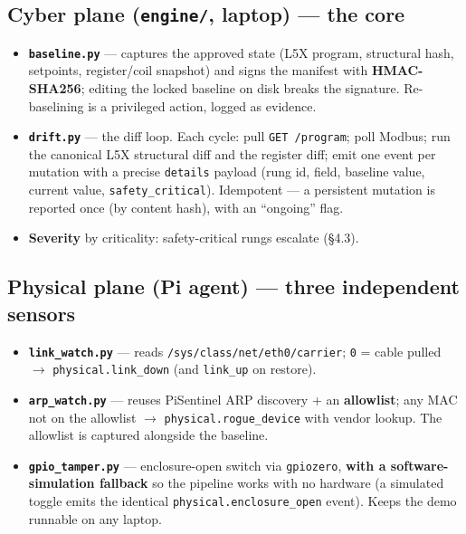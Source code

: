 \documentclass[11pt,a4paper]{article}
\newcommand{\code}[1]{\texttt{\small #1}}
\begin{document}
\subsection{Cyber plane (\texttt{engine/}, laptop) --- the core}
\begin{itemize}[leftmargin=1.4em,itemsep=2pt]
  \item \textbf{\code{baseline.py}} --- captures the approved state (L5X program, structural hash,
        setpoints, register/coil snapshot) and signs the manifest with \textbf{HMAC-SHA256}; editing
        the locked baseline on disk breaks the signature. Re-baselining is a privileged action, logged as evidence.
  \item \textbf{\code{drift.py}} --- the diff loop. Each cycle: pull \code{GET /program}; poll Modbus;
        run the canonical L5X structural diff and the register diff; emit one event per mutation with a precise
        \code{details} payload (rung id, field, baseline value, current value, \code{safety\_critical}).
        Idempotent --- a persistent mutation is reported once (by content hash), with an ``ongoing'' flag.
  \item \textbf{Severity} by criticality: safety-critical rungs escalate (\S4.3).
\end{itemize}

\subsection{Physical plane (Pi agent) --- three independent sensors}
\begin{itemize}[leftmargin=1.4em,itemsep=2pt]
  \item \textbf{\code{link\_watch.py}} --- reads \code{/sys/class/net/eth0/carrier}; \code{0} = cable
        pulled $\rightarrow$ \code{physical.link\_down} (and \code{link\_up} on restore).
  \item \textbf{\code{arp\_watch.py}} --- reuses PiSentinel ARP discovery + an \textbf{allowlist}; any
        MAC not on the allowlist $\rightarrow$ \code{physical.rogue\_device} with vendor lookup. The
        allowlist is captured alongside the baseline.
  \item \textbf{\code{gpio\_tamper.py}} --- enclosure-open switch via \code{gpiozero}, \textbf{with a
        software-simulation fallback} so the pipeline works with no hardware (a simulated toggle emits
        the identical \code{physical.enclosure\_open} event). Keeps the demo runnable on any laptop.
\end{itemize}
\end{document}
